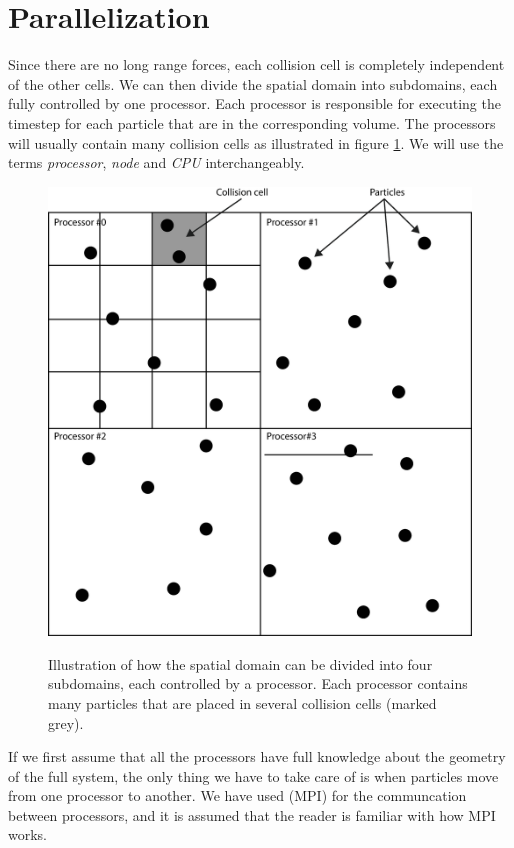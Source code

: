 \section{Parallelization}
Since there are no long range forces, each collision cell is completely independent of the other cells. We can then divide the spatial domain into subdomains, each fully controlled by one processor. Each processor is responsible for executing the timestep for each particle that are in the corresponding volume. The processors will usually contain many collision cells as illustrated in figure \ref{fig:dsmc_parallelization_1}. We will use the terms \textit{processor}, \textit{node} and \textit{CPU} interchangeably.
\begin{figure}[h]
\begin{center}
\includegraphics[width=\textwidth, trim=0cm 0cm 0cm 0cm, clip]{DSMC/figures/parallelization.eps}
\label{fig:dsmc_parallelization_1}
\end{center}
\caption{Illustration of how the spatial domain can be divided into four subdomains, each controlled by a processor. Each processor contains many particles that are placed in several collision cells (marked grey).}
\end{figure}
If we first assume that all the processors have full knowledge about the geometry of the full system, the only thing we have to take care of is when particles move from one processor to another. We have used (MPI) for the communcation between processors, and it is assumed that the reader is familiar with how MPI works. 

